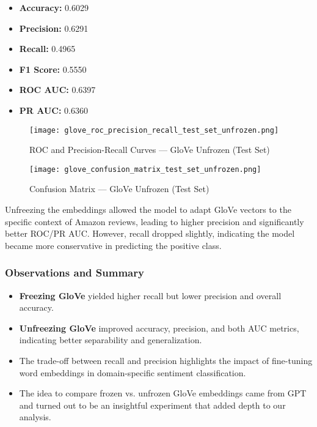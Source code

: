 \documentclass[12pt]{article}
\begin{document}
\begin{itemize}
    \item \textbf{Accuracy:} 0.6029
    \item \textbf{Precision:} 0.6291
    \item \textbf{Recall:} 0.4965
    \item \textbf{F1 Score:} 0.5550
    \item \textbf{ROC AUC:} 0.6397
    \item \textbf{PR AUC:} 0.6360
\end{itemize}

\begin{figure}[H]
    \centering
    \texttt{[image: glove\_roc\_precision\_recall\_test\_set\_unfrozen.png]}
    \caption{ROC and Precision-Recall Curves — GloVe Unfrozen (Test Set)}
\end{figure}

\begin{figure}[H]
    \centering
    \texttt{[image: glove\_confusion\_matrix\_test\_set\_unfrozen.png]}
    \caption{Confusion Matrix — GloVe Unfrozen (Test Set)}
\end{figure}

Unfreezing the embeddings allowed the model to adapt GloVe vectors to the specific context of Amazon reviews, leading to higher precision and significantly better ROC/PR AUC. However, recall dropped slightly, indicating the model became more conservative in predicting the positive class.

\subsubsection*{Observations and Summary}

\begin{itemize}
    \item \textbf{Freezing GloVe} yielded higher recall but lower precision and overall accuracy.
    \item \textbf{Unfreezing GloVe} improved accuracy, precision, and both AUC metrics, indicating better separability and generalization.
    \item The trade-off between recall and precision highlights the impact of fine-tuning word embeddings in domain-specific sentiment classification.
    \item The idea to compare frozen vs. unfrozen GloVe embeddings came from GPT and turned out to be an insightful experiment that added depth to our analysis.
\end{itemize}
\end{document}
